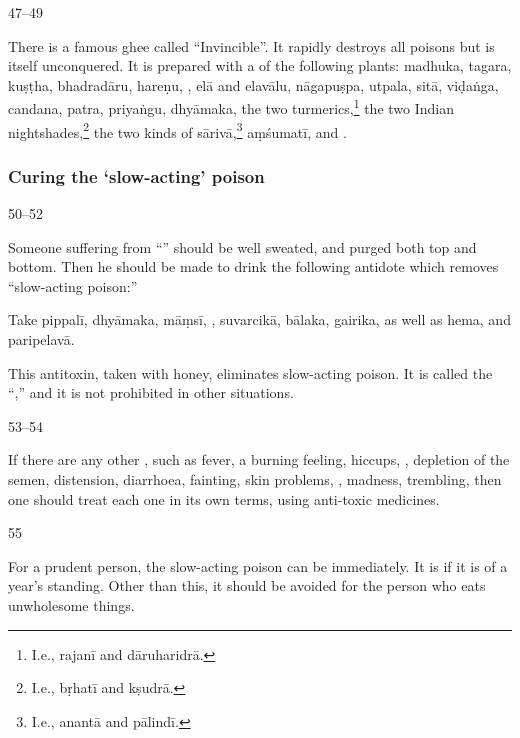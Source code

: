   \begin{translation}
    
    \item[47--49]
    
    \label{ajeya} There is a famous ghee called “Invincible”. 
    It rapidly destroys all poisons but is itself unconquered. It is prepared with a
 of the following plants: %
\gls{madhuka},
\gls{tagara},
\gls{kuṣṭha},
\gls{bhadradāru},
\gls{hareṇu},
,
\gls{elā}
and \gls{elavālu},
\gls{nāgapuṣpa},
\gls{utpala},
\gls{sitā},
\gls{viḍaṅga},
\gls{candana},
\gls{patra},
\gls{priyaṅgu},
\gls{dhyāmaka},
the two turmerics,\footnote{I.e., \gls{rajanī} and \gls{dāruharidrā}.}
the two Indian nightshades,\footnote{I.e., \gls{bṛhatī} and \gls{kṣudrā}.}
the two kinds of \gls{sārivā},\footnote{I.e., \gls{anantā} and \gls{pālindī}.}
\gls{aṃśumatī},
and 
.
    
    \end{translation}

\subsubsection{Curing the `slow-acting' poison}
    

\begin{translation}    
    
    \item[ 50--52]
    
Someone suffering from “” should be
well sweated, and purged both top and bottom.  Then he should be made
to drink the following  antidote which removes
“slow-acting poison:”
    
    Take
    \gls{pippalī},
    \gls{dhyāmaka},
    \gls{māṃsī},
,
\gls{suvarcikā},
\gls{bālaka}, 
\gls{gairika}, as well as \gls{hema},
and
\gls{paripelavā}.

This antitoxin, taken with honey, eliminates slow-acting poison. It is called the
“,” and it is not prohibited in other situations.
 
    \item[ 53--54]

If there are any other , such as fever, a
burning feeling, hiccups, , depletion of the
semen, distension, diarrhoea, fainting, skin problems,
, madness, trembling, then one should treat
each one in its own terms,  using anti-toxic medicines.
    
    \item[ 55] 
    
For a prudent person, the slow-acting poison can be
 immediately.  It is  if it is
of a year's standing. Other than this, it should be avoided for the
person who eats unwholesome things.

    \end{translation}


